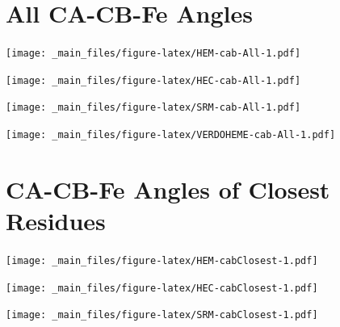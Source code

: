 \documentclass[a4paper, nobind]{templates/ociamthesis}
\let\origfigure\figure
\let\endorigfigure\endfigure
\renewenvironment{figure}[1][2] {
    \expandafter\origfigure\expandafter[H]
} {
    \endorigfigure
}
\begin{document}
\hypertarget{figs-cabAll}{%
\section{All CA-CB-Fe Angles}\label{figs-cabAll}}

\begin{figure}
\centering
\texttt{[image: \_main\_files/figure-latex/HEM-cab-All-1.pdf]}
\caption{\label{fig:HEM-cab-All}HEM: All CA-CB-Fe Angles}
\end{figure}

\begin{figure}
\centering
\texttt{[image: \_main\_files/figure-latex/HEC-cab-All-1.pdf]}
\caption{\label{fig:HEC-cab-All}HEC: All CA-CB-Fe Angles}
\end{figure}

\begin{figure}
\centering
\texttt{[image: \_main\_files/figure-latex/SRM-cab-All-1.pdf]}
\caption{\label{fig:SRM-cab-All}SRM: All CA-CB-Fe Angles}
\end{figure}

\begin{figure}
\centering
\texttt{[image: \_main\_files/figure-latex/VERDOHEME-cab-All-1.pdf]}
\caption{\label{fig:VERDOHEME-cab-All}VERDOHEME: All CA-CB-Fe Angles}
\end{figure}

\hypertarget{figs-cabClosest}{%
\section{CA-CB-Fe Angles of Closest Residues}\label{figs-cabClosest}}

\begin{figure}
\centering
\texttt{[image: \_main\_files/figure-latex/HEM-cabClosest-1.pdf]}
\caption{\label{fig:HEM-cabClosest}HEM: CACBFe Angles of Closest Residues}
\end{figure}

\begin{figure}
\centering
\texttt{[image: \_main\_files/figure-latex/HEC-cabClosest-1.pdf]}
\caption{\label{fig:HEC-cabClosest}HEC: CACBFe Angles of Closest Residues}
\end{figure}

\begin{figure}
\centering
\texttt{[image: \_main\_files/figure-latex/SRM-cabClosest-1.pdf]}
\caption{\label{fig:SRM-cabClosest}SRM: CACBFe Angles of Closest Residues}
\end{figure}
\end{document}
